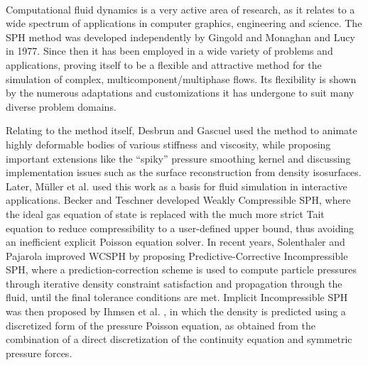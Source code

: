 \documentclass{llncs}
\begin{document}
\paragraph{} Computational fluid dynamics is a very active area of research, as it relates
to a wide spectrum of applications in computer graphics, engineering and science. The SPH
method was developed independently by Gingold and Monaghan \cite{gingold1977375} and Lucy
\cite{lucy19771013} in 1977. Since then it has been employed in a wide variety of problems
and applications, proving itself to be a flexible and attractive method for the simulation
of complex, multicomponent/multiphase flows. Its flexibility is shown by the numerous
adaptations and customizations it has undergone to suit many diverse problem domains.

Relating to the method itself, Desbrun and Gascuel \cite{desbrun1996smoothed} used the
method to animate highly deformable bodies of various stiffness and viscosity, while
proposing important extensions like the ``spiky'' pressure smoothing kernel and discussing
implementation issues such as the surface reconstruction from density isosurfaces. Later,
M\"{u}ller et al. \cite{muller2003particle} used this work as a basis for fluid simulation
in interactive applications. Becker and Teschner \cite{becker2007weakly} developed Weakly
Compressible SPH, where the ideal gas equation of state is replaced with the much more
strict Tait equation to reduce compressibility to a user-defined upper bound, thus
avoiding an inefficient explicit Poisson equation solver. In recent years, Solenthaler and
Pajarola \cite{solenthaler2009predictive} improved WCSPH by proposing
Predictive-Corrective Incompressible SPH, where a prediction-correction scheme is used to
compute particle pressures through iterative density constraint satisfaction and
propagation through the fluid, until the final tolerance conditions are met. Implicit
Incompressible SPH was then proposed by Ihmsen et al. \cite{ihmsen2014implicit}, in which
the density is predicted using a discretized form of the pressure Poisson equation, as
obtained from the combination of a direct discretization of the continuity equation and
symmetric pressure forces.
\end{document}
